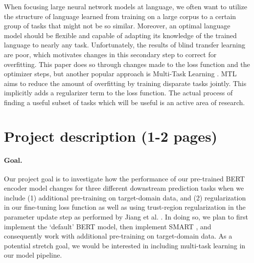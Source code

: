 \documentclass{article}
\begin{document}
When focusing large neural network models at language, we often want to utilize the structure of language learned from training on a large corpus to a certain group of tasks that might not be so similar. Moreover, an optimal language model should be flexible and capable of adapting its knowledge of the trained language to nearly any task. Unfortunately, the results of blind transfer learning are poor, which motivates changes in this secondary step to correct for overfitting. This paper does so through changes made to the loss function and the optimizer steps, but another popular approach is Multi-Task Learning \cite{MTL}. MTL aims to reduce the amount of overfitting by training disparate tasks jointly. This implicitly adds a regularizer term to the loss function. The actual process of finding a useful subset of tasks which will be useful is an active area of research. 


\section{Project description (1-2 pages)}

\paragraph{Goal.} 
Our project goal is to investigate how the performance of our pre-trained BERT encoder model changes for three different downstream prediction tasks when we include (1) additional pre-training on target-domain data, and (2) regularization in our fine-tuning loss function as well as using trust-region regularization in the parameter update step as performed by Jiang et al. \cite{smart}. In doing so, we plan to first implement the `default' BERT model, then implement SMART \cite{smart}, and consequently work with additional pre-training on target-domain data. As a potential stretch goal, we would be interested in including multi-task learning in our model pipeline.

\end{document}
